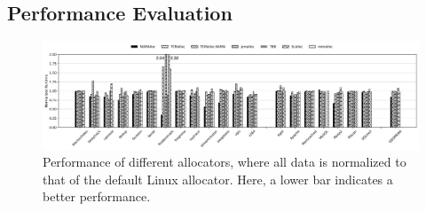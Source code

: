 \subsection{Performance Evaluation}

\label{sec:performance}
\begin{figure}[!ht]
    \centering
    \includegraphics[width=7in]{SC2022/figure/8-node-parsec-perf.jpg}
    \caption{Performance of different allocators, where all data is normalized to \\ that of the default Linux allocator. Here, a lower bar indicates a better performance.
    \label{fig:perf}}
 \end{figure}
 
